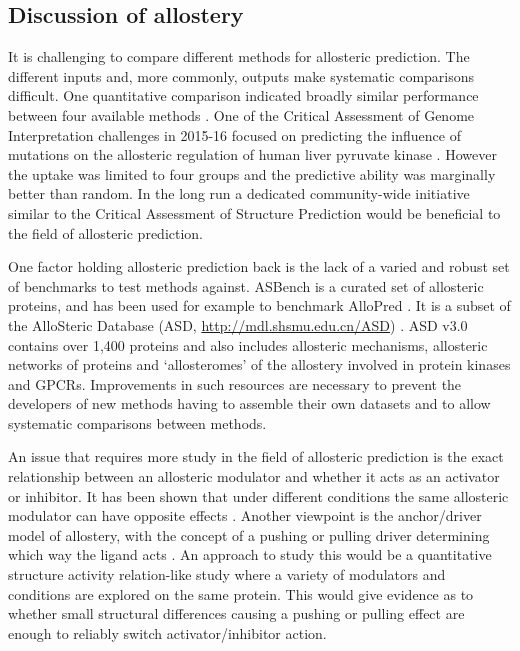 \subsection{Discussion of allostery}

It is challenging to compare different methods for allosteric prediction.
The different inputs and, more commonly, outputs make systematic comparisons difficult.
One quantitative comparison indicated broadly similar performance between four available methods \cite{Greener2017}.
One of the Critical Assessment of Genome Interpretation challenges in 2015-16 focused on predicting the influence of mutations on the allosteric regulation of human liver pyruvate kinase \cite{Xu2017}.
However the uptake was limited to four groups and the predictive ability was marginally better than random.
In the long run a dedicated community-wide initiative similar to the Critical Assessment of Structure Prediction \cite{Moult2016} would be beneficial to the field of allosteric prediction.

One factor holding allosteric prediction back is the lack of a varied and robust set of benchmarks to test methods against.
ASBench \cite{Huang2015} is a curated set of allosteric proteins, and has been used for example to benchmark AlloPred \cite{Greener2015}.
It is a subset of the AlloSteric Database (ASD, \url{http://mdl.shsmu.edu.cn/ASD}) \cite{Shen2016}.
ASD v3.0 contains over 1,400 proteins and also includes allosteric mechanisms, allosteric networks of proteins and `allosteromes' of the allostery involved in protein kinases and GPCRs.
Improvements in such resources are necessary to prevent the developers of new methods having to assemble their own datasets \cite{Panjkovich2012, Mitternacht2011, Amor2016} and to allow systematic comparisons between methods.

An issue that requires more study in the field of allosteric prediction is the exact relationship between an allosteric modulator and whether it acts as an activator or inhibitor.
It has been shown that under different conditions the same allosteric modulator can have opposite effects \cite{Motlagh2012}.
Another viewpoint is the anchor/driver model of allostery, with the concept of a pushing or pulling driver determining which way the ligand acts \cite{Nussinov2014}.
An approach to study this would be a quantitative structure activity relation-like study where a variety of modulators and conditions are explored on the same protein.
This would give evidence as to whether small structural differences causing a pushing or pulling effect are enough to reliably switch activator/inhibitor action.

